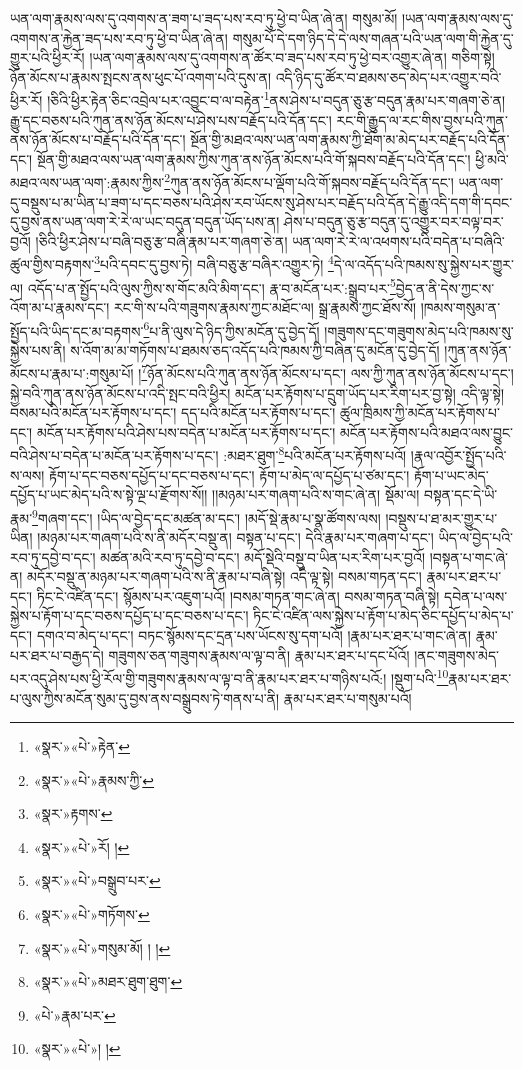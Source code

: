 ཡན་ལག་རྣམས་ལས་དུ་འགགས་ན་ཟག་པ་ཟད་པས་རབ་ཏུ་ཕྱེ་བ་ཡིན་ཞེ་ན། གསུམ་མོ། །ཡན་ལག་རྣམས་ལས་དུ་འགགས་ན་རྐྱེན་ཟད་པས་རབ་ཏུ་ཕྱེ་བ་ཡིན་ཞེ་ན། གསུམ་པོ་དེ་དག་ཉིད་དེ་དེ་ལས་གཞན་པའི་ཡན་ལག་གི་རྐྱེན་དུ་གྱུར་པའི་ཕྱིར་རོ། །ཡན་ལག་རྣམས་ལས་དུ་འགགས་ན་ཚོར་བ་ཟད་པས་རབ་ཏུ་ཕྱེ་བར་འགྱུར་ཞེ་ན། གཅིག་སྟེ། ཉོན་མོངས་པ་རྣམས་སྤངས་ནས་ཕུང་པོ་འགག་པའི་དུས་ན། འདི་ཉིད་དུ་ཚོར་བ་ཐམས་ཅད་མེད་པར་འགྱུར་བའི་ཕྱིར་རོ། །ཅིའི་ཕྱིར་རྟེན་ཅིང་འབྲེལ་པར་འབྱུང་བ་ལ་བརྟེན་\footnote{«སྣར་»«པེ་»རྟེན་}ནས་ཤེས་པ་བདུན་ཅུ་རྩ་བདུན་རྣམ་པར་གཞག་ཅེ་ན། རྒྱུ་དང་བཅས་པའི་ཀུན་ནས་ཉོན་མོངས་པ་ཤེས་པས་བརྗོད་པའི་དོན་དང་། རང་གི་རྒྱུད་ལ་རང་གིས་བྱས་པའི་ཀུན་ནས་ཉོན་མོངས་པ་བརྗོད་པའི་དོན་དང་། སྔོན་གྱི་མཐའ་ལས་ཡན་ལག་རྣམས་ཀྱི་ཐོག་མ་མེད་པར་བརྗོད་པའི་དོན་དང་། སྔོན་གྱི་མཐའ་ལས་ཡན་ལག་རྣམས་ཀྱིས་ཀུན་ནས་ཉོན་མོངས་པའི་གོ་སྐབས་བརྗོད་པའི་དོན་དང་། ཕྱི་མའི་མཐའ་ལས་ཡན་ལག་:རྣམས་ཀྱིས་\footnote{«སྣར་»«པེ་»རྣམས་ཀྱི་}ཀུན་ནས་ཉོན་མོངས་པ་ལྡོག་པའི་གོ་སྐབས་བརྗོད་པའི་དོན་དང་། ཡན་ལག་དུ་བསྡུས་པ་མ་ཡིན་པ་ཟག་པ་དང་བཅས་པའི་ཤེས་རབ་ཡོངས་སུ་ཤེས་པར་བརྗོད་པའི་དོན་དེ་རྒྱུ་འདི་དག་གི་དབང་དུ་བྱས་ནས་ཡན་ལག་རེ་རེ་ལ་ཡང་བདུན་བདུན་ཡོད་པས་ན། ཤེས་པ་བདུན་ཅུ་རྩ་བདུན་དུ་འགྱུར་བར་བལྟ་བར་བྱའོ། །ཅིའི་ཕྱིར་ཤེས་པ་བཞི་བཅུ་རྩ་བཞི་རྣམ་པར་གཞག་ཅེ་ན། ཡན་ལག་རེ་རེ་ལ་འཕགས་པའི་བདེན་པ་བཞིའི་ཚུལ་གྱིས་བརྟགས་\footnote{«སྣར་»རྟགས་}པའི་དབང་དུ་བྱས་ཏེ། བཞི་བཅུ་རྩ་བཞིར་འགྱུར་ཏེ། \footnote{«སྣར་»«པེ་»རོ། ། }དེ་ལ་འདོད་པའི་ཁམས་སུ་སྐྱེས་པར་གྱུར་ལ། འདོད་པ་ན་སྤྱོད་པའི་ལུས་ཀྱིས་ས་གོང་མའི་མིག་དང་། རྣ་བ་མངོན་པར་:སྒྲུབ་པར་\footnote{«སྣར་»«པེ་»བསྒྲུབ་པར་}བྱེད་ན་ནི་དེས་ཀྱང་ས་འོག་མ་པ་རྣམས་དང་། རང་གི་ས་པའི་གཟུགས་རྣམས་ཀྱང་མཐོང་ལ། སྒྲ་རྣམས་ཀྱང་ཐོས་སོ། །ཁམས་གསུམ་ན་སྤྱོད་པའི་ཡིད་དང་མ་བརྟགས་\footnote{«སྣར་»«པེ་»གཏོགས་}པ་ནི་ལུས་དེ་ཉིད་ཀྱིས་མངོན་དུ་བྱེད་དོ། །གཟུགས་དང་གཟུགས་མེད་པའི་ཁམས་སུ་སྐྱེས་པས་ནི། ས་འོག་མ་མ་གཏོགས་པ་ཐམས་ཅད་འདོད་པའི་ཁམས་ཀྱི་བཞིན་དུ་མངོན་དུ་བྱེད་དོ། །ཀུན་ནས་ཉོན་མོངས་པ་རྣམ་པ་:གསུམ་པོ། །\footnote{«སྣར་»«པེ་»གསུམ་མོ། ། །}ཉོན་མོངས་པའི་ཀུན་ནས་ཉོན་མོངས་པ་དང་། ལས་ཀྱི་ཀུན་ནས་ཉོན་མོངས་པ་དང་། སྐྱེ་བའི་ཀུན་ནས་ཉོན་མོངས་པ་འདི་སྤང་བའི་ཕྱིར། མངོན་པར་རྟོགས་པ་དྲུག་ཡོད་པར་རིག་པར་བྱ་སྟེ། འདི་ལྟ་སྟེ། བསམ་པའི་མངོན་པར་རྟོགས་པ་དང་། དད་པའི་མངོན་པར་རྟོགས་པ་དང་། ཚུལ་ཁྲིམས་ཀྱི་མངོན་པར་རྟོགས་པ་དང་། མངོན་པར་རྟོགས་པའི་ཤེས་པས་བདེན་པ་མངོན་པར་རྟོགས་པ་དང་། མངོན་པར་རྟོགས་པའི་མཐའ་ལས་བྱུང་བའི་ཤེས་པ་བདེན་པ་མངོན་པར་རྟོགས་པ་དང་། :མཐར་ཐུག་\footnote{«སྣར་»«པེ་»མཐར་ཐུག་ཐུག་}པའི་མངོན་པར་རྟོགས་པའོ། །རྣལ་འབྱོར་སྤྱོད་པའི་ས་ལས། རྟོག་པ་དང་བཅས་དཔྱོད་པ་དང་བཅས་པ་དང་། རྟོག་པ་མེད་ལ་དཔྱོད་པ་ཙམ་དང་། རྟོག་པ་ཡང་མེད་དཔྱོད་པ་ཡང་མེད་པའི་ས་སྟེ་ལྔ་པ་རྫོགས་སོ།། །།མཉམ་པར་གཞག་པའི་ས་གང་ཞེ་ན། སྡོམ་ལ། བསྟན་དང་དེ་ཡི་རྣམ་\footnote{«པེ་»རྣམ་པར་}གཞག་དང་། །ཡིད་ལ་བྱེད་དང་མཚན་མ་དང་། །མདོ་སྡེ་རྣམ་པ་སྣ་ཚོགས་ལས། །བསྡུས་པ་ཐ་མར་གྱུར་པ་ཡིན། །མཉམ་པར་གཞག་པའི་ས་ནི་མདོར་བསྡུ་ན། བསྟན་པ་དང་། དེའི་རྣམ་པར་གཞག་པ་དང་། ཡིད་ལ་བྱེད་པའི་རབ་ཏུ་དབྱེ་བ་དང་། མཚན་མའི་རབ་ཏུ་དབྱེ་བ་དང་། མདོ་སྡེའི་བསྡུ་བ་ཡིན་པར་རིག་པར་བྱའོ། །བསྟན་པ་གང་ཞེ་ན། མདོར་བསྡུ་ན་མཉམ་པར་གཞག་པའི་ས་ནི་རྣམ་པ་བཞི་སྟེ། འདི་ལྟ་སྟེ། བསམ་གཏན་དང་། རྣམ་པར་ཐར་པ་དང་། ཏིང་ངེ་འཛིན་དང་། སྙོམས་པར་འཇུག་པའོ། །བསམ་གཏན་གང་ཞེ་ན། བསམ་གཏན་བཞི་སྟེ། དབེན་པ་ལས་སྐྱེས་པ་རྟོག་པ་དང་བཅས་དཔྱོད་པ་དང་བཅས་པ་དང་། ཏིང་ངེ་འཛིན་ལས་སྐྱེས་པ་རྟོག་པ་མེད་ཅིང་དཔྱོད་པ་མེད་པ་དང་། དགའ་བ་མེད་པ་དང་། བཏང་སྙོམས་དང་དྲན་པས་ཡོངས་སུ་དག་པའོ། །རྣམ་པར་ཐར་པ་གང་ཞེ་ན། རྣམ་པར་ཐར་པ་བརྒྱད་དེ། གཟུགས་ཅན་གཟུགས་རྣམས་ལ་ལྟ་བ་ནི། རྣམ་པར་ཐར་པ་དང་པོའོ། །ནང་གཟུགས་མེད་པར་འདུ་ཤེས་པས་ཕྱི་རོལ་གྱི་གཟུགས་རྣམས་ལ་ལྟ་བ་ནི་རྣམ་པར་ཐར་པ་གཉིས་པའོ:། །སྡུག་པའི་\footnote{«སྣར་»«པེ་»། །}རྣམ་པར་ཐར་པ་ལུས་ཀྱིས་མངོན་སུམ་དུ་བྱས་ནས་བསྒྲུབས་ཏེ་གནས་པ་ནི། རྣམ་པར་ཐར་པ་གསུམ་པའོ། 
